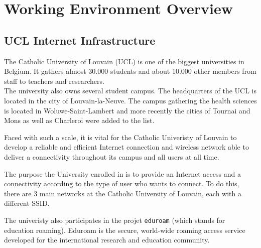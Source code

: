 
\chapter{Working Environment Overview} %

\label{Chapter2} %



\section{UCL Internet Infrastructure}
The Catholic University of Louvain (UCL) is one of the biggest universities in Belgium. It gathers almost 30.000 students and about 10.000 other members from staff to teachers and researchers.\\

The university also owns several student campus. The headquarters of the UCL is located in the city of Louvain-la-Neuve. The campus gathering the health sciences is located in Woluwe-Saint-Lambert and more recently the cities of Tournai and Mons as well as Charleroi were added to the list.

Faced with such a scale, it is vital for the Catholic Univeristy of Louvain to develop a reliable and efficient Internet connection and wireless network able to deliver a connectivity throughout its campus and all users at all time.

The purpose the University enrolled in is to provide an Internet access and a connectivity according to the type of user who wants to connect. To do this, there are 3 main networks at the Catholic University of Louvain, each with a different SSID.

The univeristy also participates in the projet \texttt{eduroam} (which stands for education roaming). Eduroam is the secure, world-wide roaming access service developed for the international research and education community\cite{eduroam1}.

